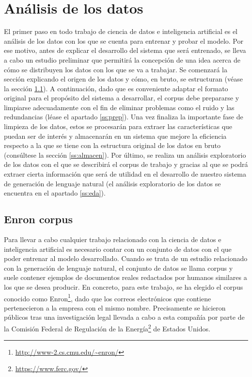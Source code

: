 \section{Análisis de los datos}\label{s:analisis}
El primer paso en todo trabajo de ciencia de datos e inteligencia artificial es el análisis de los datos con los que se cuenta para entrenar y probar el modelo. Por ese motivo, antes de explicar el desarrollo del sistema que será entrenado, se lleva a cabo un estudio preliminar que permitirá la concepción de una idea acerca de cómo se distribuyen los datos con los que se va a trabajar. Se comenzará la sección explicando el origen de los datos y cómo, en bruto, se estructuran (véase la sección \ref{ss:enron}). A continuación, dado que es conveniente adaptar el formato original para el propósito del sistema a desarrollar, el corpus debe prepararse y limpiarse adecuadamente con el fin de eliminar problemas como el ruido y las redundancias (léase el apartado \ref{ss:prep}). Una vez finaliza la importante fase de limpieza de los datos, estos se procesarán para extraer las características que puedan ser de interés y almacenarán en un sistema que mejore la eficiencia respecto a la que se tiene con la estructura original de los datos en bruto (consúltese la sección \ref{ss:almacen}). Por último, se realiza un análisis exploratorio de los datos con el que se describirá el corpus de trabajo y gracias al que se podrá extraer cierta información que será de utilidad en el desarrollo de nuestro sistema de generación de lenguaje natural (el análisis exploratorio de los datos se encuentra en el apartado \ref{ss:eda}).

\subsection{Enron corpus}\label{ss:enron}
Para llevar a cabo cualquier trabajo relacionado con la ciencia de datos e inteligencia artificial es necesario contar con un conjunto de datos con el que poder entrenar al modelo desarrollado. Cuando se trata de un estudio relacionado con la generación de lenguaje natural, el conjunto de datos se llama corpus y suele contener ejemplos de documentos reales redactados por humanos similares a los que se desea producir. En concreto, para este trabajo, se ha elegido el corpus conocido como Enron\footnote{\url{http://www-2.cs.cmu.edu/~enron/}}, dado que los correos electrónicos que contiene pertenecieron a la empresa con el mismo nombre. Precisamente se hicieron públicos tras una investigación legal llevada a cabo a esta compañía por parte de la Comisión Federal de Regulación de la Energía\footnote{\url{https://www.ferc.gov/}} de Estados Unidos.

